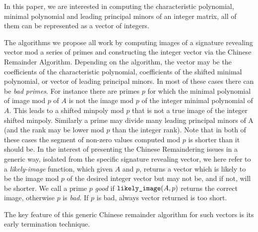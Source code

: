 In this paper, we are interested in computing the characteristic polynomial,
minimal polynomial and leading principal minors of an integer matrix, all
of them can be represented as a vector of integers. 

The algorithms we
propose all work by computing images of a signature revealing vector 
mod a series of primes
and constructing the integer vector via the Chinese Remainder Algorithm.
Depending on the algorithm, the vector may be the coefficients of the 
characteristic polynomial, coefficients of the shifted minimal polynomial,
or vector of leading principal minors.
In most of these cases there can be {\em bad primes}.  For instance 
there are primes $p$ for which the minimal polynomial of image mod $p$ of $A$ 
is not the image mod $p$ of the integer minimal polynomial of $A$.  This 
leads to a shifted minpoly mod $p$ that is not a true image of the integer
shifted minpoly. Similarly
a prime may divide many leading principal minors of A (and the rank may be
lower mod $p$ than the integer rank).  Note that in both of these cases
the segment of non-zero values computed mod $p$ is shorter than it should be.
In the interest of presenting the Chinese Remaindering issues in a generic
way, isolated from the specific signature revealing vector, we here
refer to a {\em likely-image} function, which given $A$ and $p$, returns
a vector which is likely to be the image mod $p$ of the desired integer vector
but may not be, and if not, will be shorter.
We call a prime $p$ {\em good} if $\mbox{\tt likely\_image}(A, p)$ returns the correct image,
otherwise $p$ is {\em bad}.  If $p$ is bad, always vector returned is too short.


The key feature of this generic Chinese remainder algorithm for such vectors 
is its early termination technique.

